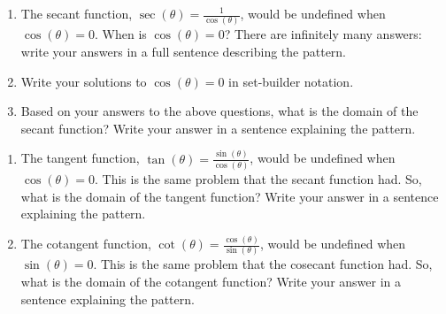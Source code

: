 \begin{myPractice}
	\begin{enumerate}
		\item The secant function, $\sec(\theta)=\frac{1}{\cos(\theta)}$, would be undefined when $\cos(\theta)=0$. When is $\cos(\theta)=0$? There are infinitely many answers: write your answers in a full sentence describing the pattern.
		\vfill
		\item Write your solutions to $\cos(\theta)=0$ in set-builder notation.
		\vfill
		\item Based on your answers to the above questions, what is the domain of the secant function? Write your answer in a sentence explaining the pattern.
		\vfill
	\end{enumerate}
\end{myPractice}

\newpage

\begin{myPractice}
	\begin{enumerate}
		\item The tangent function, $\tan(\theta)=\frac{\sin(\theta)}{\cos(\theta)}$, would be undefined when $\cos(\theta)=0$. This is the same problem that the secant function had. So, what is the domain of the tangent function? Write your answer in a sentence explaining the pattern.
		\vfill
		\item The cotangent function, $\cot(\theta)=\frac{\cos(\theta)}{\sin(\theta)}$, would be undefined when $\sin(\theta)=0$. This is the same problem that the cosecant function had. So, what is the domain of the cotangent function? Write your answer in a sentence explaining the pattern.
		\vfill
	\end{enumerate}
\end{myPractice}

